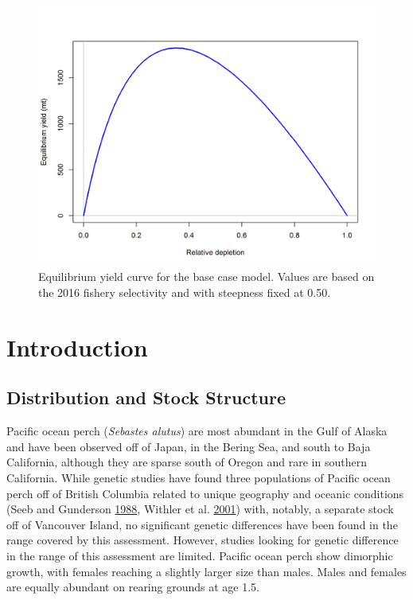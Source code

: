 \documentclass[12pt,]{article}
\begin{document}
\FloatBarrier

\begin{figure}
\centering
\includegraphics{r4ss/plots_mod1/yield1_yield_curve.png}
\caption{Equilibrium yield curve for the base case model. Values are
based on the 2016 fishery selectivity and with steepness fixed at 0.50.
\label{fig:Yield_all}}
\end{figure}

\FloatBarrier

\newpage

\renewcommand{\thefigure}{\arabic{figure}}
\renewcommand{\thetable}{\arabic{table}}

\setcounter{figure}{0} \setcounter{table}{0}


\section{Introduction}\label{introduction}

\subsection{Distribution and Stock
Structure}\label{distribution-and-stock-structure}

Pacific ocean perch (\emph{Sebastes alutus}) are most abundant in the
Gulf of Alaska and have been observed off of Japan, in the Bering Sea,
and south to Baja California, although they are sparse south of Oregon
and rare in southern California. While genetic studies have found three
populations of Pacific ocean perch off of British Columbia related to
unique geography and oceanic conditions (Seeb and Gunderson
\protect\hyperlink{ref-seeb_genetic_1988}{1988}, Withler et al.
\protect\hyperlink{ref-withler_co-existing_2001}{2001}) with, notably, a
separate stock off of Vancouver Island, no significant genetic
differences have been found in the range covered by this assessment.
However, studies looking for genetic difference in the range of this
assessment are limited. Pacific ocean perch show dimorphic growth, with
females reaching a slightly larger size than males. Males and females
are equally abundant on rearing grounds at age 1.5.
\end{document}
